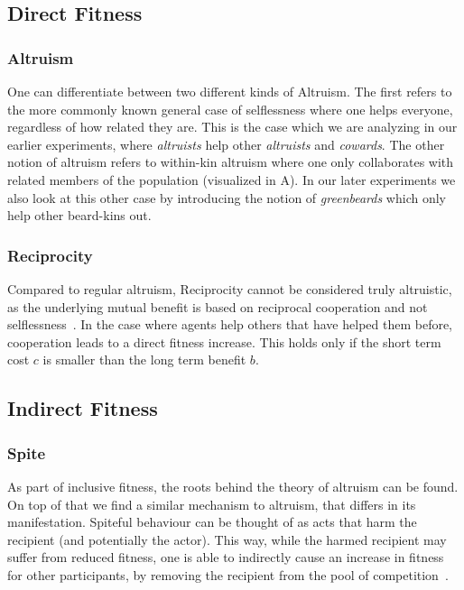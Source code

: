 \documentclass[sigconf]{acmart}
\newcommand{\cowards}{\textit{cowards}\xspace}
\newcommand{\altruists}{\textit{altruists}\xspace}
\newcommand{\greenbeards}{\textit{greenbeards}\xspace}
\begin{document}
    \subsection{Direct Fitness}\label{subsec:direct_fit}

    \subsubsection{Altruism}
    One can differentiate between two different kinds of Altruism.   %
    The first refers to the more commonly known general case of selflessness where one helps everyone, regardless of how related they are.
    This is the case which we are analyzing in our earlier experiments, where \altruists help other \altruists and \cowards.
    The other notion of altruism refers to within-kin altruism where one only collaborates with related members of the population (visualized in  A).
    In our later experiments we also look at this other case by introducing the notion of \greenbeards which only help other beard-kins out.

    \subsubsection{Reciprocity}\label{reciprocity}
    Compared to regular altruism, Reciprocity cannot be considered truly altruistic, as the underlying mutual benefit is based on reciprocal cooperation and not selflessness~\cite{triversEvolutionReciprocalAltruism1971}.
    In the case where agents help others that have helped them before, cooperation leads to a direct fitness increase.
    This holds only if the short term cost $c$ is smaller than the long term benefit $b$.

    \subsection{Indirect Fitness}\label{subsec:indirect_fitness}

    \subsubsection{Spite}
    As part of inclusive fitness, the roots behind the theory of altruism can be found.
    On top of that we find a similar mechanism to altruism, that differs in its manifestation.
    Spiteful behaviour can be thought of as acts that harm the recipient (and potentially the actor).
    This way, while the harmed recipient may suffer from reduced fitness, one is able to indirectly cause an increase in fitness for other participants, by removing the recipient from the pool of competition~\cite{hamiltonSelfishSpitefulBehaviour1970}.
\end{document}
